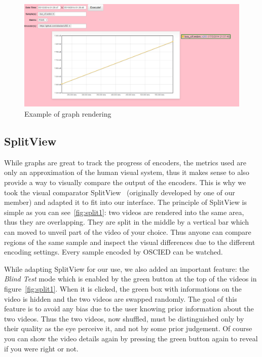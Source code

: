 \documentclass[a4paper,12pt]{article}
\begin{document}
\begin{figure}[!h] \centering
  \includegraphics[width=1\textwidth]{figures/graph1.png}
  \caption{Example of graph rendering}
  \label{fig:graph1}
\end{figure}

\subsection{SplitView}
While graphs are great to track the progress of encoders, the metrics used are
only an approximation of the human visual system, thus it makes sense to also
provide a way to visually compare the output of the encoders.
This is why we took the visual comparator SplitView~\cite{splitview}
(originally developed by one of our member) and adapted it to fit into our
interface.  The principle of SplitView is simple as you can
see~\ref{fig:split1}: two videos are rendered into the same area, thus they are
overlapping.  They are split in the middle by a vertical bar which can moved to
unveil part of the video of your choice.  Thus anyone can compare regions of the
same sample and inspect the visual differences due to the different encoding
settings. Every sample encoded by OSCIED can be watched.

While adapting SplitView for our use, we also added an important feature: the
\emph{Blind Test} mode which is enabled by the green button at the top of the
videos in figure~\ref{fig:split1}.  When it is clicked, the green box with
informations on the video is hidden and the two videos are swapped randomly. The goal
of this feature is to avoid any bias due to the user knowing prior information
about the two videos.  Thus the two videos, now shuffled, must be distinguished
only by their quality as the eye perceive it, and not by some prior judgement.
Of course you can show the video details again by pressing the green button
again to reveal if you were right or not.
\end{document}
